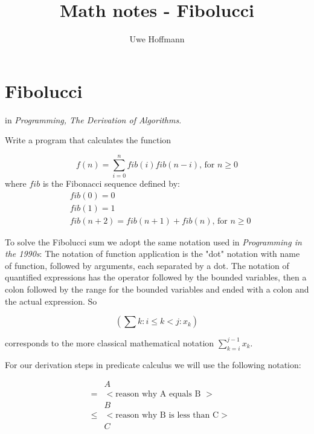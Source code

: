 

\title{Math notes - Fibolucci}
\author{Uwe Hoffmann}



\setcounter{chapter}{1}
\section*{Fibolucci}

 in \textit{Programming, The Derivation of Algorithms}\cite{Kaldewaij90}.

\vspace{10 mm}
\begin{problem}
Write a program that calculates the function 

\begin{equation*}
f(n) = \sum_{i = 0}^{n} \mathit{fib}(i) \mathit{fib}(n - i)  \text{, for } n \geq 0
\end{equation*}
where $\mathit{fib}$ is the Fibonacci sequence defined by:
\begin{equation*}
\begin{split}
& \mathit{fib}(0) = 0 \\
& \mathit{fib}(1) = 1 \\
& \mathit{fib}(n + 2) = \mathit{fib}(n + 1) + \mathit{fib}(n) \text{, for } n \geq 0
\end{split}   
\end{equation*}

\end{problem}

To solve the Fibolucci sum we adopt the same notation used in \textit{Programming in the 1990s}\cite{Cohen90}: The notation of function application is the "dot" notation with name of function, followed by arguments, each separated by a dot. The notation of quantified expressions has the operator followed by the bounded variables, then a colon followed by the range for the bounded variables and ended with a colon and the actual expression. So

\[	 
	(\sum k : i \leq k < j : x_k)
\]

\noindent corresponds to the more classical mathematical notation $\sum_{k = i}^{ j - 1}x_k$. 

For our derivation steps in predicate calculus we will use the following notation:

\[
\begin{array}{lcl}
		&&A \\
	      &=& { < \mbox{reason why A equals B } >} \\      
                  &&B \\
                &\leq& { < \mbox{reason why B is less than C} >} \\
                  && C  
   \end{array}
\]

